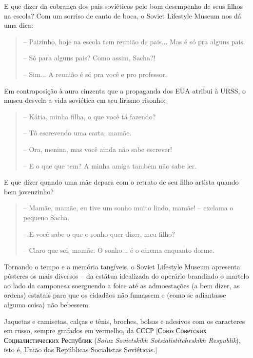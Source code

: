 E que dizer da cobrança dos pais soviéticos pelo bom desempenho de seus
filhos na escola? Com um sorriso de canto de boca, o Soviet Lifestyle
Museum nos dá uma dica:

\begin{quote}
-- Paizinho, hoje na escola tem reunião de pais... Mas é só pra alguns
pais.

-- Só para alguns pais? Como assim, Sacha?!

-- Sim... A reunião é só pra você e pro professor.
\end{quote}

Em contraposição à aura cinzenta que a propaganda dos EUA atribui à
URSS, o museu desvela a vida soviética em seu lirismo risonho:

\begin{quote}
-- Kátia, minha filha, o que você tá fazendo?

-- Tô escrevendo uma carta, mamãe.

-- Ora, menina, mas você ainda não sabe escrever!

-- E o que que tem? A minha amiga também não sabe ler.
\end{quote}

E que dizer quando uma mãe depara com o retrato de seu filho artista
quando bem jovenzinho?

\begin{quote}
-- Mamãe, mamãe, eu tive um sonho muito lindo, mamãe! -- exclama o
pequeno Sacha.

-- E você sabe o que o sonho quer dizer, meu filho?

-- Claro que sei, mamãe. O sonho... é o cinema enquanto dorme.
\end{quote}

Tornando o tempo e a memória tangíveis, o Soviet Lifestyle Museum
apresenta pôsteres os mais diversos -- da estátua idealizada do operário
brandindo o martelo ao lado da camponesa soerguendo a foice até as
admoestações (a bem dizer, as ordens) estatais para que os cidadãos não
fumassem e (como se adiantasse alguma coisa) não bebessem.

Jaquetas e camisetas, calças e tênis, broches, bolsas e adesivos com os
caracteres em russo, sempre grafados em vermelho, da СССР {[}Союз
Советских Социалистических Республик (\emph{Soiuz Sovietskikh
Sotsialistitcheskikh Respublik}), isto é, União das Repúblicas
Socialistas Soviéticas.{]}

